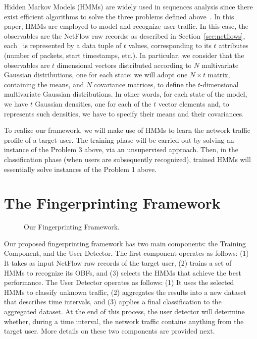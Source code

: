 \documentclass[10pt,conference,compsocconf,letterpaper]{IEEEtran}
\begin{document}
Hidden Markov Models (HMMs) are widely used in
sequences analysis since there exist efficient algorithms to solve the three problems defined 
above~\cite{Durbin98biologicalsequence,Jurafsky,sphinx}.  In this paper, HMMs
are employed to model and recognize user traffic. In this case, the observables are the NetFlow raw
records: as described in Section~\ref{sec:netflows}, each \nfr\ is
represented by a data tuple of $t$ values, corresponding to its
$t$ attributes (number of packets, start timestamps, etc.). In
particular, we consider that the observables are $t$ dimensional
vectors distributed according to $N$ multivariate Gaussian
distributions, one for each state: we will adopt one $N\times t$
matrix, containing the means, and $N$ covariance matrices, to define
the $t$-dimensional multivariate Gaussian distributions. In other words, for each
state of the model, we have $t$ Gaussian densities, one for each of the
$t$ vector elements and, to represents such densities, we have to
specify their means and their covariances.

To realize our framework, we will make use of HMMs to learn the network traffic 
profile of a target user. The training phase will be carried out 
by solving an instance of the Problem 3 above, via an unsupervised 
approach. Then, in the classification phase (when users are subsequently recognized), 
trained HMMs will essentially solve instances of the Problem 1 above. 

\section{The Fingerprinting Framework}\label{sec:profiling-framework}
\label{sec:framework}

\begin{figure*}[ht]
  \centering \hfill
  \hfill
  \hfill
      \caption{Our Fingerprinting Framework.}
\end{figure*}


Our proposed fingerprinting framework has two main components: the
Training Component, and the User Detector. 
The first component operates as follows: (1) It takes as input NetFlow raw records of the target
user, (2) trains a set of HMMs to recognize its OBFs, and (3) selects the HMMs
that achieve the best performance. 
The User Detector operates as follows: (1) It uses the 
selected HMMs to classify unknown traffic, (2) aggregates the results into a
new dataset that describes time intervals, and (3) applies a final classification
to the aggregated dataset. At the end of this process, the user detector
will determine whether, during a time interval,  the network traffic contains
anything from the target user. 
More details on these two components are provided next.
\end{document}
